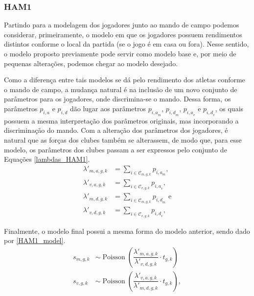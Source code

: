 \subsubsection{HAM1}
\label{HAM1_text}

Partindo para a modelagem dos jogadores junto ao mando de campo podemos considerar, primeiramente, o modelo em que os jogadores possuem rendimentos distintos conforme o local da partida (se o jogo é em casa ou fora). Nesse sentido, o modelo proposto previamente pode servir como modelo base e, por meio de pequenas alterações, podemos chegar ao modelo desejado.

Como a diferença entre tais modelos se dá pelo rendimento dos atletas conforme o mando de campo, a mudança natural é na inclusão de um novo conjunto de parâmetros para os jogadores, onde discrimina-se o mando. Dessa forma, os parâmetros $p_{i, a}$ e $p_{i, d}$ dão lugar aos parâmetros $p_{{i, a}_m}$, $p_{{i, d}_m}$, $p_{{i, a}_v}$ e $p_{{i, d}_v}$, os quais possuem a mesma interpretação dos parâmetros originais, mas incorporando a discriminação do mando. Com a alteração dos parâmetros dos jogadores, é natural que as forças dos clubes também se alterassem, de modo que, para esse modelo, os parâmetros dos clubes passam a ser expressos pelo conjunto de Equações \ref{lambdas_HAM1}.
\begin{equation}
    \begin{split}
        \lambda'_{m, a, g, k} & = \sum_{i \in \mathcal{C}_{m, g, k}} p_{{i, a}_m}, \\
        \lambda'_{v, a, g, k} & = \sum_{i \in \mathcal{C}_{v, g, k}} p_{{i, a}_v}, \\
        \lambda'_{m, d, g, k} & = \sum_{i \in \mathcal{C}_{m, g, k}} p_{{i, d}_m} \text{ e} \\
        \lambda'_{v, d, g, k} & = \sum_{i \in \mathcal{C}_{v, g, k}} p_{{i, d}_v},
    \end{split}
    \label{lambdas_HAM1}
\end{equation}

Finalmente, o modelo final possui a mesma forma do modelo anterior, sendo dado por \ref{HAM1_model}.
\begin{equation}
    \begin{split}
    s_{m, g, k} & \sim \operatorname{Poisson}\left(\dfrac{\lambda'_{m,a,g,k}}{\lambda'_{v,d,g,k}} \cdot t_{g,k}\right) \\
    s_{v, g, k} & \sim \operatorname{Poisson}\left(\dfrac{\lambda'_{v,a,g,k}}{\lambda'_{m,d,g,k}} \cdot t_{g,k}\right),
    \end{split}
    \label{HAM1_model}
\end{equation}


